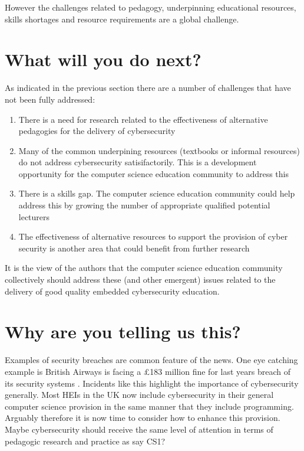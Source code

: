 \documentclass[sigconf]{acmart}
\begin{document}
However the challenges related to pedagogy, underpinning educational resources, skills shortages and resource requirements are a global challenge.

\section {What will you do next?}	
As indicated in the previous section there are a number of challenges that have not been fully addressed:
\begin{enumerate}
	\item There is a need for research related to the effectiveness of alternative pedagogies for the delivery of cybersecurity
	\item Many of the common underpining resources (textbooks or informal resources) do not address cybersecurity satisifactorily. This is a development opportunity for the computer science education community to address this
	\item There is a skills gap. The computer science education community could help address this by growing the number of appropriate qualified potential lecturers
	\item The effectiveness of alternative resources to support the provision of cyber security is another area that could benefit from further research
\end{enumerate}
It is the view of the authors that the computer science education community collectively should address these (and other emergent) issues related to the delivery of good quality embedded cybersecurity education.

\section{Why are you telling us this?}	
Examples of security breaches are common feature of the news. One eye catching example is British Airways is facing a \pounds183 million fine for last years breach of its security systems \cite{BBC2019}. Incidents like this highlight the importance of cybersecurity generally. Most HEIs in the UK now include cybersecurity in their general computer science provision in the same manner that they include programming. Arguably therefore it is now time to consider how to enhance this provision. Maybe cybersecurity should receive the same level of attention in terms of pedagogic research and practice as say CS1?  
\end{document}
